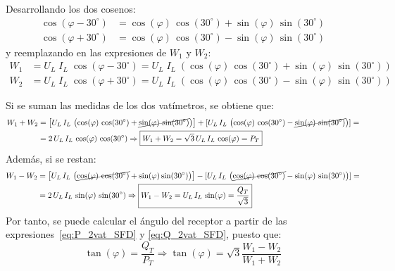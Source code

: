 	Desarrollando los dos cosenos:
\begin{align*}
  \cos(\varphi-{30^\circ}) &= \cos(\varphi)\,\cos({30^\circ}) + \sin(\varphi)\,\sin({30^\circ})\\
  \cos(\varphi+{30^\circ}) &= \cos(\varphi)\,\cos({30^\circ}) - \sin(\varphi)\,\sin({30^\circ})
\end{align*}
y reemplazando en las expresiones de $W_1$ y $W_2$:
\begin{align*}
    W_1&=U_L\;I_L\;\cos{(\varphi-30^\circ)}=U_L\;I_L\;\left( \cos(\varphi)\,\cos({30^\circ}) + \sin(\varphi)\,\sin({30^\circ})\right)\\
    W_2&=U_L\;I_L\;\cos{(\varphi+30^\circ)}=U_L\;I_L\;\left( \cos(\varphi)\,\cos({30^\circ}) - \sin(\varphi)\,\sin({30^\circ})\right)
\end{align*}

Si se suman las medidas de los dos vatímetros, se obtiene que:
\begin{align}\label{eq:P_2vat_SFD}
    W_1+W_2&=\left[ U_L\,I_L\,\left( \cos(\varphi)\,\cos({30^\circ}) + \cancel{\sin(\varphi)\,\sin({30^\circ})}\right) \right] + [U_L\,I_L\,\left( \cos(\varphi)\,\cos({30^\circ}) - \cancel{\sin(\varphi)\,\sin({30^\circ})}\right) ]=\nonumber\\
    &=2\,U_L\,I_L\,\cos(\varphi)\,\cos({30^\circ}) \Rightarrow \boxed{W_1 + W_2 = \sqrt{3}\,U_L\, I_L\,\cos(\varphi) = P_T}
\end{align}
Además, si se restan: 
\begin{align}\label{eq:Q_2vat_SFD}
    W_1-W_2&=\left[U_L\,I_L\,\left( \cancel{\cos(\varphi)\,\cos({30^\circ})} + \sin(\varphi)\sin({30^\circ})\right)\right] - [U_L\,I_L\,\left( \cancel{\cos(\varphi)\,\cos({30^\circ})} - \sin(\varphi)\,\sin({30^\circ})\right) ]=\nonumber\\
    &=2\,U_L\,I_L\,\sin(\varphi)\,\sin({30^\circ}) \Rightarrow \boxed{W_1 - W_2 = U_L\, I_L\,\sin(\varphi) = \frac{Q_T}{\sqrt{3}}}
\end{align}
Por tanto, se puede calcular el ángulo del receptor a partir de las expresiones~\eqref{eq:P_2vat_SFD} y \eqref{eq:Q_2vat_SFD}, puesto que:
\begin{equation}
    \tan(\varphi) = \dfrac{Q_T}{P_T}\Rightarrow \boxed{\tan(\varphi) = \sqrt{3} \frac{W_1 - W_2}{W_1 + W_2}}
\end{equation}

